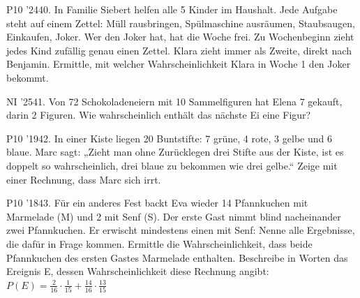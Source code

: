 \documentclass[11pt]{article}
\begin{document}
\pfgruppe{}
\begin{pfaufg}{P10 ’24}{\llap{\textasteriskcentered\,}40.}{}
In Familie Siebert helfen alle 5 Kinder im Haushalt. Jede Aufgabe steht auf einem Zettel: Müll rausbringen, Spülmaschine ausräumen, Staubsaugen, Einkaufen, Joker. Wer den Joker hat, hat die Woche frei. Zu Wochenbeginn zieht jedes Kind zufällig genau einen Zettel. Klara zieht immer als Zweite, direkt nach Benjamin. Ermittle, mit welcher Wahrscheinlichkeit Klara in Woche 1 den Joker bekommt.
\end{pfaufg}
\pfgruppe{}
\begin{pfaufg}{NI ’25}{41.}{}
Von 72 Schokoladeneiern mit 10 Sammelfiguren hat Elena 7 gekauft, darin 2 Figuren. Wie wahrscheinlich enthält das nächste Ei eine Figur?
\end{pfaufg}
\pfgruppe{}
\begin{pfaufg}{P10 ’19}{\llap{\textasteriskcentered\,}42.}{}
In einer Kiste liegen 20 Buntstifte: 7 grüne, 4 rote, 3 gelbe und 6 blaue. Marc sagt: „Zieht man ohne Zurücklegen drei Stifte aus der Kiste, ist es doppelt so wahrscheinlich, drei blaue zu bekommen wie drei gelbe.“ Zeige mit einer Rechnung, dass Marc sich irrt.
\end{pfaufg}
\pfgruppe{}
\begin{pfaufg}{P10 ’18}{\llap{\textasteriskcentered\,}43.}{}
Für ein anderes Fest backt Eva wieder 14 Pfannkuchen mit Marmelade (M) und 2 mit Senf (S). Der erste Gast nimmt blind nacheinander zwei Pfannkuchen. Er erwischt mindestens einen mit Senf: Nenne alle Ergebnisse, die dafür in Frage kommen. Ermittle die Wahrscheinlichkeit, dass beide Pfannkuchen des ersten Gastes Marmelade enthalten. Beschreibe in Worten das Ereignis E, dessen Wahrscheinlichkeit diese Rechnung angibt: $P(E) = \tfrac{2}{16}\cdot\tfrac{1}{15} + \tfrac{14}{16}\cdot\tfrac{13}{15}$
\end{pfaufg}
\end{document}
